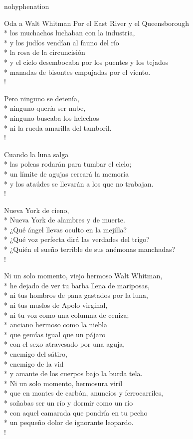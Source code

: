 \documentclass[
    a5paper,
    DIV=10,
    12pt,
    notitlepage,
    oneside,]
{scrbook} %
\begin{document}
\begin{hyphenrules}{nohyphenation}
\begin{poem}{Oda a Walt Whitman}{}{\vspace{-1em}}
Por el East River y el Queensborough\\*
los muchachos luchaban con la industria,\\*
y los judíos vendían al fauno del río\\*
la rosa de la circuncisión\\*
y el cielo desembocaba por los puentes y los tejados\\*
manadas de bisontes empujadas por el viento.\\!

Pero ninguno se detenía,\\*
ninguno quería ser nube,\\*
ninguno buscaba los helechos\\*
ni la rueda amarilla del tamboril.\\!

Cuando la luna salga\\*
las poleas rodarán para tumbar el cielo;\\*
un límite de agujas cercará la memoria\\*
y los ataúdes se llevarán a los que no trabajan.\\!

Nueva York de cieno,\\*
Nueva York de alambres y de muerte.\\*
¿Qué ángel llevas oculto en la mejilla?\\*
¿Qué voz perfecta dirá las verdades del trigo?\\*
¿Quién el sueño terrible de sus anémonas manchadas? \\!

Ni un solo momento, viejo hermoso Walt Whitman,\\*
he dejado de ver tu barba llena de mariposas,\\*
ni tus hombros de pana gastados por la luna,\\*
ni tus muslos de Apolo virginal,\\*
ni tu voz como una columna de ceniza;\\*
anciano hermoso como la niebla\\*
que gemías igual que un pájaro\\*
con el sexo atravesado por una aguja,\\*
enemigo del sátiro,\\*
enemigo de la vid\\*
y amante de los cuerpos bajo la burda tela.\\*
Ni un solo momento, hermosura viril\\*
que en montes de carbón, anuncios y ferrocarriles,\\*
soñabas ser un río y dormir como un río\\*
con aquel camarada que pondría en tu pecho\\*
un pequeño dolor de ignorante leopardo.\\!


\end{poem}
\end{hyphenrules}
\end{document}
